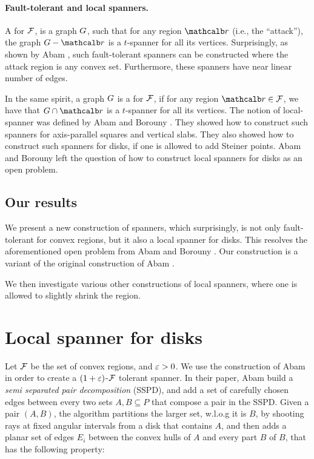 \documentclass[12pt]{article}%
\begin{document}
\paragraph{Fault-tolerant and local spanners.}

A  for $\mathcal{F}$, is a graph $G$, such that
for any region $\region$ (i.e., the ``attack''), the graph
$\G \gminus \region$ is a $t$-spanner for all its
vertices. Surprisingly, as shown by Abam \etal \cite{abfg-rftgs-09},
such fault-tolerant spanners can be constructed where the attack
region is any convex set. Furthermore, these spanners have near linear
number of edges.

In the same spirit, a graph $G$ is a  for $\mathcal{F}$,
if for any region $\region \in \FF$, we have that
$\restrictY{\G}{\region}$ is a $t$-spanner for all its vertices.  The
notion of local-spanner was defined by Abam and Borouny
\cite{ab-lgs-21}. They showed how to construct such spanners for
axis-parallel squares and vertical slabs. They also showed how to
construct such spanners for disks, if one is allowed to add Steiner
points. Abam and Borouny left the question of how to construct local
spanners for disks as an open problem.

\subsection*{Our results}

We present a new construction of spanners, which surprisingly, is not
only fault-tolerant for convex regions, but it also a local spanner
for disks. This resolves the aforementioned open problem from Abam and
Borouny \cite{ab-lgs-21}. Our construction is a variant of the
original construction of Abam \etal \cite{abfg-rftgs-09}.

We then investigate various other constructions of local spanners,
where one is allowed to slightly shrink the region.
	
	
	
	
\section{Local spanner for disks}

Let $\mathcal{F}$ be the set of convex regions, and $\varepsilon>0$. We use the
construction of Abam \etal \cite{abfg-rftgs-09} in order to create a
$(1+\varepsilon)$-$\mathcal{F}$ tolerant spanner. In their paper, Abam \etal build a
\emph{semi separated pair decomposition} (SSPD), and add a set of
carefully chosen edges between every two sets $A,B\subseteq P$ that
compose a pair in the SSPD. Given a pair $(A,B)$, the algorithm
partitions the larger set, w.l.o.g it is $B$, by shooting rays at
fixed angular intervals from a disk that contains $A$, and then adds a
planar set of edges $E_i$ between the convex hulls of $A$ and every
part $B$ of $B$, that has the following property:
\end{document}
